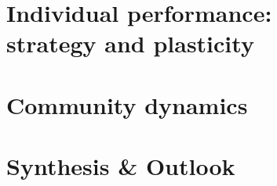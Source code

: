 \documentclass[a4paper, notoc, justified,marginals=left, nobib]{tufte-book}
\newcommand{\model}{\textit{\texttt{MountGrass}}}
\begin{document}
\part[Individual performance: strategy and plasticity]{Individual performance:\\strategy and plasticity}\label{part:individuals}

\begin{refsection}
\setcounter{chapter}{0}


\begin{fullwidth}
\printbibliography[heading=bibliography] 
\end{fullwidth}
\end{refsection}

\part{Community dynamics}\label{part:community}

\begin{refsection}
\setcounter{chapter}{0}


\begin{fullwidth}
\printbibliography[heading=bibliography] 
\end{fullwidth}
\end{refsection}

\part{Synthesis \& Outlook}\label{part:synthesis}
\setcounter{chapter}{0}
\begin{refsection}



%

\begin{fullwidth}
\printbibliography[heading=bibliography] 
\end{fullwidth}
\end{refsection}
%
\newpage
\end{document}
